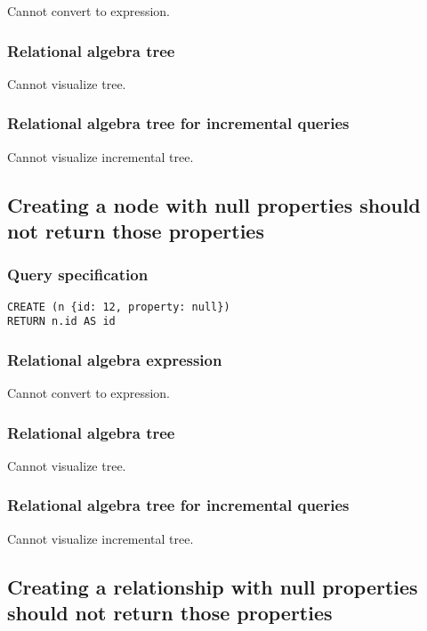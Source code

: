 Cannot convert to expression.

\subsubsection*{Relational algebra tree}

Cannot visualize tree.

\subsubsection*{Relational algebra tree for incremental queries}

Cannot visualize incremental tree.

\subsection{Creating a node with null properties should not return those properties}

\subsubsection*{Query specification}

\begin{lstlisting}
CREATE (n {id: 12, property: null})
RETURN n.id AS id
\end{lstlisting}

\subsubsection*{Relational algebra expression}

Cannot convert to expression.

\subsubsection*{Relational algebra tree}

Cannot visualize tree.

\subsubsection*{Relational algebra tree for incremental queries}

Cannot visualize incremental tree.

\subsection{Creating a relationship with null properties should not return those properties}

